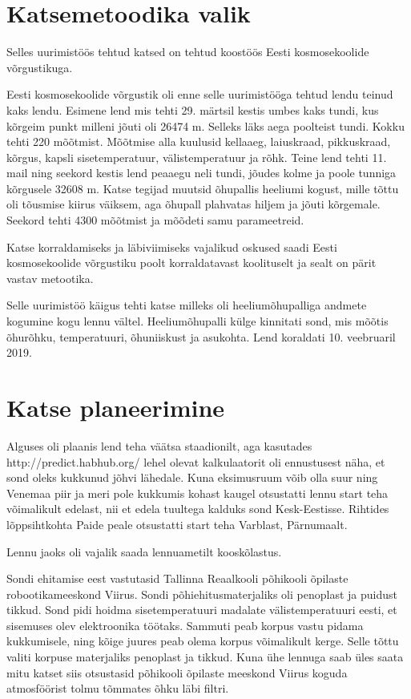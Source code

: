 \documentclass{trkut}%
\begin{document}
\section{Katsemetoodika valik}
Selles uurimistöös tehtud katsed on tehtud koostöös Eesti kosmosekoolide võrgustikuga.

Eesti kosmosekoolide võrgustik oli enne selle uurimistööga tehtud lendu teinud kaks lendu. Esimene lend mis tehti 29. märtsil kestis umbes kaks tundi, kus kõrgeim punkt milleni jõuti oli 26474 m. Selleks läks aega poolteist tundi. Kokku tehti 220 mõõtmist. Mõõtmise alla kuulusid kellaaeg, laiuskraad, pikkuskraad, kõrgus, kapsli sisetemperatuur, välistemperatuur ja rõhk. Teine lend tehti 11. mail ning seekord kestis lend peaaegu neli tundi, jõudes kolme ja poole tunniga kõrgusele 32608 m. Katse tegijad muutsid õhupallis heeliumi kogust, mille tõttu oli tõusmise kiirus väiksem, aga õhupall plahvatas hiljem ja jõuti kõrgemale. Seekord tehti 4300 mõõtmist ja mõõdeti samu parameetreid.

Katse korraldamiseks ja läbiviimiseks vajalikud oskused saadi Eesti kosmosekoolide võrgustiku poolt korraldatavast koolituselt ja sealt on pärit vastav metootika.

Selle uurimistöö käigus tehti katse milleks oli heeliumõhupalliga andmete kogumine kogu lennu vältel. Heeliumõhupalli külge kinnitati sond, mis mõõtis õhurõhku, temperatuuri, õhuniiskust ja asukohta. Lend koraldati 10. veebruaril 2019.

\section{Katse planeerimine}
Alguses oli plaanis lend teha väätsa staadionilt, aga kasutades http://predict.habhub.org/ lehel olevat kalkulaatorit oli ennustusest näha, et sond oleks kukkunud jõhvi lähedale. Kuna eksimusruum võib olla suur ning Venemaa piir ja meri pole kukkumis kohast kaugel otsustatti lennu start teha võimalikult edelast, nii et edela tuultega kalduks sond Kesk-Eestisse. Rihtides lõppsihtkohta Paide peale otsustatti start teha Varblast, Pärnumaalt.

Lennu jaoks oli vajalik saada lennuametilt kooskõlastus.

Sondi ehitamise eest vastutasid Tallinna Reaalkooli põhikooli õpilaste robootikameeskond Viirus. Sondi põhiehitusmaterjaliks oli penoplast ja puidust tikkud. Sond pidi hoidma sisetemperatuuri madalate välistemperatuuri eesti, et sisemuses olev elektroonika töötaks. Sammuti peab korpus vastu pidama kukkumisele, ning kõige juures peab olema korpus võimalikult kerge. Selle tõttu valiti korpuse materjaliks penoplast ja tikkud. Kuna ühe lennuga saab üles saata mitu katset siis otsustasid põhikooli õpilaste meeskond Viirus koguda atmosföörist tolmu tõmmates õhku läbi filtri. 
\end{document}
